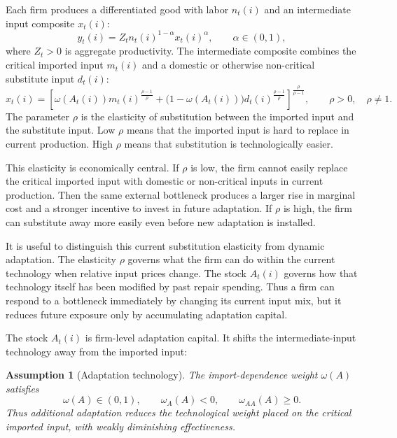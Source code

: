 ﻿\documentclass[12pt]{article}
\newtheorem{assumption}{Assumption}
\theoremstyle{remark}
\begin{document}
Each firm produces a differentiated good with labor $n_t(i)$ and an intermediate input composite
$x_t(i)$:
\begin{equation}
    y_t(i)=Z_t n_t(i)^{1-\alpha}x_t(i)^\alpha,
    \qquad
    \alpha\in(0,1),
    \label{eq:production}
\end{equation}
where $Z_t>0$ is aggregate productivity. The intermediate composite combines the critical imported
input $m_t(i)$ and a domestic or otherwise non-critical substitute input $d_t(i)$:
\begin{equation}
    x_t(i)=
    \left[
        \omega(A_t(i))m_t(i)^{\frac{\rho-1}{\rho}}
        +
        \bigl(1-\omega(A_t(i))\bigr)d_t(i)^{\frac{\rho-1}{\rho}}
    \right]^{\frac{\rho}{\rho-1}},
    \qquad
    \rho>0,\quad \rho\neq 1.
    \label{eq:x_ces}
\end{equation}
The parameter $\rho$ is the elasticity of substitution between the imported input and the
substitute input. Low $\rho$ means that the imported input is hard to replace in current
production. High $\rho$ means that substitution is technologically easier.

This elasticity is economically central. If $\rho$ is low, the firm cannot easily replace the
critical imported input with domestic or non-critical inputs in current production. Then the same
external bottleneck produces a larger rise in marginal cost and a stronger incentive to invest in
future adaptation. If $\rho$ is high, the firm can substitute away more easily even before new
adaptation is installed.

It is useful to distinguish this current substitution elasticity from dynamic adaptation. The
elasticity $\rho$ governs what the firm can do within the current technology when relative input
prices change. The stock $A_t(i)$ governs how that technology itself has been modified by past
repair spending. Thus a firm can respond to a bottleneck immediately by changing its current input
mix, but it reduces future exposure only by accumulating adaptation capital.

The stock $A_t(i)$ is firm-level adaptation capital. It shifts the intermediate-input technology
away from the imported input:
\begin{assumption}[Adaptation technology]\label{ass:omega}
The import-dependence weight $\omega(A)$ satisfies
\begin{equation}
    \omega(A)\in(0,1),\qquad
    \omega_A(A)<0,\qquad
    \omega_{AA}(A)\ge 0.
    \label{eq:omega_assumption}
\end{equation}
Thus additional adaptation reduces the technological weight placed on the critical imported input,
with weakly diminishing effectiveness.
\end{assumption}
\end{document}
